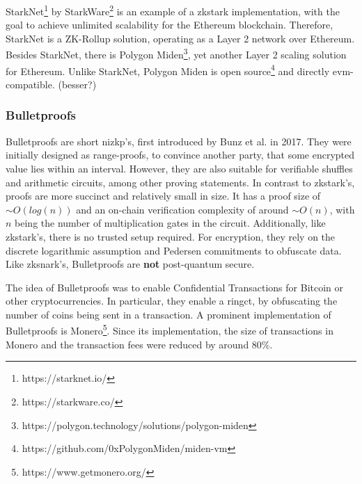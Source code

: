 StarkNet\footnote{https://starknet.io/} by StarkWare\footnote{https://starkware.co/} is an example of a \acrshort{zkstark} implementation, with the goal to achieve unlimited scalability for the Ethereum blockchain. Therefore, StarkNet is a ZK-Rollup solution, operating as a Layer 2 network over Ethereum. Besides StarkNet, there is Polygon Miden\footnote{https://polygon.technology/solutions/polygon-miden}, yet another Layer 2 scaling solution for Ethereum. Unlike StarkNet, Polygon Miden is open source\footnote{https://github.com/0xPolygonMiden/miden-vm} and directly \acrfull{evm}-compatible. (besser?)

\subsubsection{Bulletproofs}
\label{subsubsec:bulletproofs}

Bulletproofs are short \acrshort{nizkp}'s, first introduced by Bunz et al. \cite{bunzBulletproofsShortProofs2018} in 2017. They were initially designed as range-proofs, to convince another party, that some encrypted value lies within an interval. However, they are also suitable for verifiable shuffles and arithmetic circuits, among other proving statements. In contrast to \acrshort{zkstark}'s, proofs are more succinct and relatively small in size. It has a proof size of $\sim O(log(n))$ and an on-chain verification complexity of around $\sim O(n)$, with $n$ being the number of multiplication gates in the circuit. Additionally, like \acrshort{zkstark}'s, there is no trusted setup required. For encryption, they rely on the discrete logarithmic assumption and Pedersen commitments to obfuscate data. Like \acrshort{zksnark}'s, Bulletproofs are \textbf{not} post-quantum secure.

The idea of Bulletproofs was to enable Confidential Transactions for Bitcoin or other cryptocurrencies. In particular, they enable a \acrfull{ringct}, by obfuscating the number of coins being sent in a transaction. A prominent implementation of Bulletproofs is Monero\footnote{https://www.getmonero.org/}. Since its implementation, the size of transactions in Monero and the transaction fees were reduced by around 80\%.